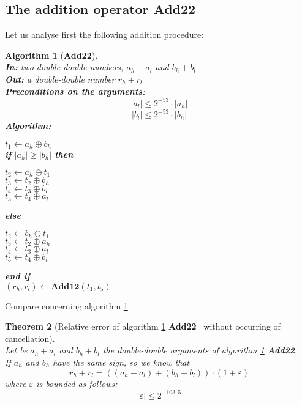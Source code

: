 \documentclass[a4paper,10pt,twoside]{article}
\newtheorem{theorem}{Theorem}[section]
\newtheorem{algorithm}[theorem]{Algorithm}
\newcommand{\hi}{\ensuremath{\mathit{h}}}
\newcommand{\lo}{\ensuremath{\mathit{l}}}
\newcommand{\AddDD}{{\bf Add22}}
\newcommand{\mAdd}{\ensuremath{\mathbf{Add12}}}
\renewcommand{\epsilon}{\varepsilon}
\begin{document}
\subsection{The addition operator \AddDD}
Let us analyse first the following addition procedure:
\begin{algorithm}[\AddDD] \label{addDDref} ~ \\
{\bf In:} two double-double numbers, $a_\hi + a_\lo$ and $b_\hi + b_\lo$ \\
{\bf Out:} a double-double number $r_\hi + r_\lo$ \\
{\bf Preconditions on the arguments:} $$\left \vert a_\lo \right \vert \leq 2^{-53} \cdot \left \vert a_\hi \right \vert$$
                                $$\left \vert b_\lo \right \vert \leq 2^{-53} \cdot \left \vert b_\hi \right \vert$$
{\bf Algorithm:} \\
\begin{center}
\begin{minipage}[b]{50mm}
$t_1 \gets a_\hi \oplus b_\hi$ \\
{\bf if} $\left \vert a_\hi \right \vert \geq \left \vert b_\hi \right \vert$ {\bf then}
\begin{center}
\begin{minipage}[b]{40mm}
$t_2 \gets a_\hi \ominus t_1$ \\
$t_3 \gets t_2 \oplus b_\hi$ \\
$t_4 \gets t_3 \oplus b_\lo$ \\
$t_5 \gets t_4 \oplus a_\lo$
\end{minipage}
\end{center}
{\bf else}
\begin{center}
\begin{minipage}[b]{40mm}
$t_2 \gets b_\hi \ominus t_1$ \\
$t_3 \gets t_2 \oplus a_\hi$ \\
$t_4 \gets t_3 \oplus a_\lo$ \\
$t_5 \gets t_4 \oplus b_\lo$
\end{minipage}
\end{center}
{\bf end if} \\
$\left( r_\hi, r_\lo \right) \gets \mAdd\left( t_1, t_5 \right)$
\end{minipage}
\end{center}
\end{algorithm}
Compare \cite{crlibmweb} concerning algorithm \ref{addDDref}.
\begin{theorem}[Relative error of algorithm \ref{addDDref} \AddDD~ without
    occurring of cancellation\label{theoAddDDref}] ~ \\
Let be $a_\hi + a_\lo$ and $b_\hi + b_\lo$ the double-double arguments of algorithm \ref{addDDref} \AddDD.\\
If $a_\hi$ and $b_\hi$ have the same sign, so we know that
$$r_\hi + r_\lo = \left(\left(a_\hi + a_\lo \right) + \left( b_\hi + b_\lo \right)\right) \cdot \left(1 + \epsilon\right)$$
where $\epsilon$ is bounded as follows:
$$\left \vert \epsilon \right \vert \leq 2^{-103,5}$$
\end{theorem}
\end{document}
